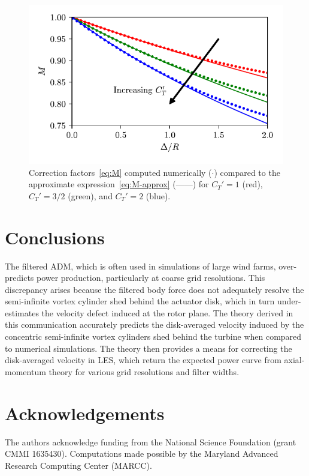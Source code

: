 \documentclass{article}
\newcommand{\full}{\protect\mbox{------}}
\begin{document}
\begin{figure}[t]
\begin{center}
\includegraphics{../fig/fig3.pdf}
\end{center}
\caption{Correction factors~\eqref{eq:M} computed numerically ($\cdot$) compared to the approximate expression~\eqref{eq:M-approx} (\full) for $C_T'=1$ (red), $C_T'=3/2$ (green), and $C_T' = 2$ (blue). }
\label{fig:integral}
\end{figure}

\section{Conclusions}
The filtered ADM, which is often used in simulations of large wind farms, over-predicts power production, particularly at coarse grid resolutions. This discrepancy arises because the filtered body force does not adequately resolve the semi-infinite vortex cylinder shed behind the actuator disk, which in turn under-estimates the velocity defect induced at the rotor plane. The theory derived in this communication accurately predicts the disk-averaged velocity induced by the concentric semi-infinite vortex cylinders shed behind the turbine when compared to numerical simulations. The theory then provides a means for correcting the disk-averaged velocity in LES, which return the expected power curve from axial-momentum theory for various grid resolutions and filter widths.

\section*{Acknowledgements}
The authors acknowledge funding from the National Science Foundation (grant CMMI 1635430). Computations made possible by the Maryland Advanced Research Computing Center (MARCC). 


\end{document}
